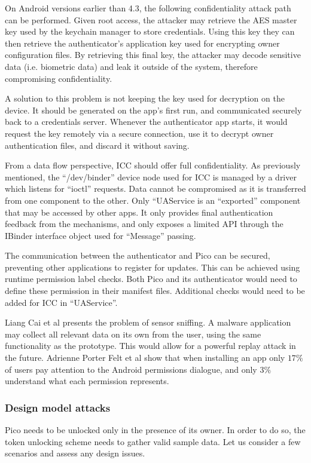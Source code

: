 On Android versions earlier than 4.3, the following confidentiality attack path can be performed. Given root access, the attacker may retrieve the AES master key used by the keychain manager to store credentials. Using this key they can then retrieve the authenticator's application key used for encrypting owner configuration files. By retrieving this final key, the attacker may decode sensitive data (i.e. biometric data) and leak it outside of the system, therefore compromising confidentiality.

A solution to this problem is not keeping the key used for decryption on the device. It should be generated on the app's first run, and communicated securely back to a credentials server. Whenever the authenticator app starts, it would request the key remotely via a secure connection, use it to decrypt owner authentication files, and discard it without saving.

From a data flow perspective, ICC should offer full confidentiality. As previously mentioned, the ``/dev/binder'' device node used for ICC is managed by a driver which listens for ``ioctl'' requests. Data cannot be compromised as it is transferred from one component to the other. Only ``UAService is an ``exported'' component that may be accessed by other apps. It only provides final authentication feedback from the mechanisms, and only exposes a limited API through the IBinder interface object used for ``Message'' passing.

The communication between the authenticator and Pico can be secured, preventing other applications to register for updates. This can be achieved using runtime permission label checks. Both Pico and its authenticator would need to define these permission in their manifest files. Additional checks would need to be added for ICC in ``UAService''.

Liang Cai et al \cite{cai2009defending} presents the problem of sensor sniffing. A malware application may collect all relevant data on its own from the user, using the same functionality as the prototype. This would allow for a powerful replay attack in the future. Adrienne Porter Felt et al \cite{felt2012android} show that when installing an app only $17\%$ of users pay attention to the Android permissions dialogue, and only $3\%$ understand what each permission represents.

\subsubsection*{Design model attacks}
\label{secdesignattacks}
Pico needs to be unlocked only in the presence of its owner. In order to do so, the token unlocking scheme needs to gather valid sample data. Let us consider a few scenarios and assess any design issues.
 
